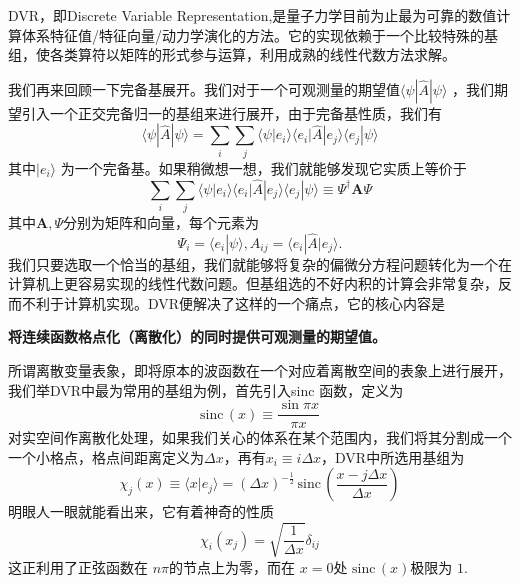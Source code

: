 \documentclass[12pt,a4paper,openany,twoside]{book}
\numberwithin{equation}{section}
\newcommand{\sinc}[1]{\mathrm{sinc} \, (#1)}
\begin{document}
      DVR，即Discrete Variable Representation,是量子力学目前为止最为可靠的数值计算体系特征值/特征向量/动力学演化的方法。它的实现依赖于一个比较特殊的基组，使各类算符以矩阵的形式参与运算，利用成熟的线性代数方法求解。

      我们再来回顾一下完备基展开。我们对于一个可观测量的期望值$\langle \psi | \hat{A} | \psi \rangle $ ，我们期望引入一个正交完备归一的基组来进行展开，由于完备基性质，我们有
      \begin{equation}
      	\langle \psi | \hat{A} | \psi \rangle = \sum_i \sum_j \langle \psi | e_i \rangle \langle e_i | \hat{A} | e_j \rangle \langle e_j | \psi \rangle 
      \end{equation}
      其中$| e_i \rangle $ 为一个完备基。如果稍微想一想，我们就能够发现它实质上等价于
      \begin{equation}
      	\sum_i \sum_j \langle \psi | e_i \rangle \langle e_i | \hat{A} | e_j \rangle \langle e_j | \psi \rangle \equiv \Psi ^\dagger\mathbf{A} \Psi
      \end{equation}
      其中$\mathbf{A}, \Psi$分别为矩阵和向量，每个元素为
      \[
      	\Psi_i = \langle e_i | \psi \rangle , A_{ij} = \langle e_i | \hat{A} | e_j \rangle 
      .\] 
      我们只要选取一个恰当的基组，我们就能够将复杂的偏微分方程问题转化为一个在计算机上更容易实现的线性代数问题。但基组选的不好内积的计算会非常复杂，反而不利于计算机实现。DVR便解决了这样的一个痛点，它的核心内容是
      \begin{center}
      	\textbf{将连续函数格点化（离散化）的同时提供可观测量的期望值。}
      \end{center}
      所谓离散变量表象，即将原本的波函数在一个对应着离散空间的表象上进行展开，我们举DVR中最为常用的基组为例，首先引入sinc 函数，定义为
      \begin{equation}
      	\mathrm{sinc} \, (x) \equiv \frac{\sin{\pi x}}{\pi x}  
      \end{equation}
      对实空间作离散化处理，如果我们关心的体系在某个范围内，我们将其分割成一个一个小格点，格点间距离定义为$\Delta x$，再有$x_i \equiv i\Delta x$，DVR中所选用基组为
      \begin{equation}
      	\chi_j (x) \equiv \langle x | e_j \rangle = (\Delta x)^{-\frac{1}{2}}\, \sinc{\frac{x - j \Delta x}{\Delta x}} 
      \end{equation}
      明眼人一眼就能看出来，它有着神奇的性质
      \begin{equation}
      	\chi_i (x_j) = \sqrt{\frac{1}{\Delta x}} \delta_{ij}
      \end{equation}
      这正利用了正弦函数在 $n\pi$的节点上为零，而在 $x=0$处 $\sinc{x}$极限为 $1$.
\end{document}
